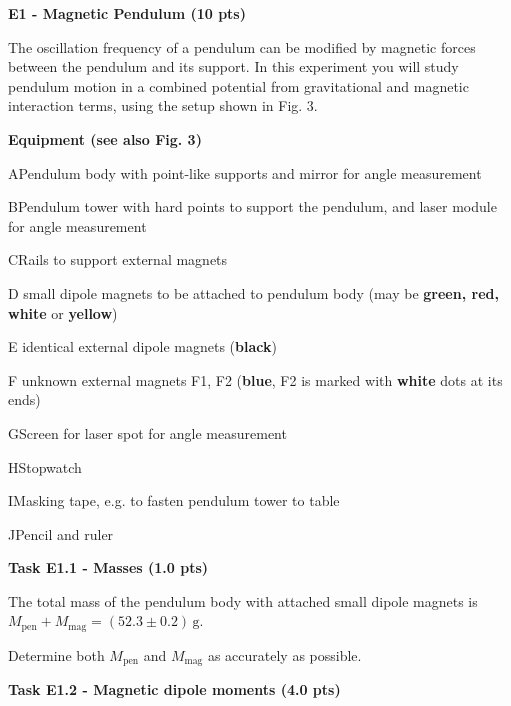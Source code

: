 {\large\textbf{E1 - Magnetic Pendulum (10 pts)}}

The oscillation frequency of a pendulum can be modified by magnetic forces
between the pendulum and its support. In this experiment you will study
pendulum motion in a combined potential from gravitational and magnetic
interaction terms, using the setup shown in Fig. 3.

\textbf{Equipment (see also Fig. 3)}

A\quad Pendulum body with point-like supports and mirror for angle measurement

B\quad Pendulum tower with hard points to support the pendulum, and laser module
for angle measurement

C\quad Rails to support external magnets

D small dipole magnets to be attached to pendulum body (may be
\textbf{green, red, white} or \textbf{yellow})

E identical external dipole magnets (\textbf{black})

F unknown external magnets F1, F2 (\textbf{blue}, F2 is marked with
\textbf{white} dots at its ends)

G\quad Screen for laser spot for angle measurement

H\quad Stopwatch

I\quad Masking tape, e.g. to fasten pendulum tower to table

J\quad Pencil and ruler

\noindent{}

\textbf{Task E1.1 - Masses (1.0 pts)}

The total mass of the pendulum body with attached small dipole magnets is
$M_\mathrm{pen} + M_\mathrm{mag} = (52.3 \pm 0.2)\,\mathrm{g}$.

Determine both $M_\mathrm{pen}$ and $M_\mathrm{mag}$ as accurately as possible.

\textbf{Task E1.2 - Magnetic dipole moments (4.0 pts)}

